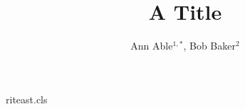 \begin{filecontents*}[overwrite]{riteast.cls}
\renewcommand{\author}[1]{{\raggedright #1\par}}
\newcommand{\affil}[1]{{\small\raggedright #1}}
\end{filecontents*}
\documentclass{riteast}

\title{A Title}
\author{Ann Able$^{1,*}$, Bob Baker$^{2}$}




\maketitle
Text.

